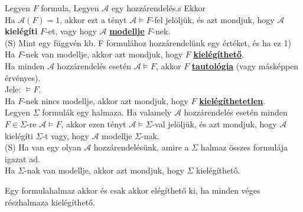 \documentclass{beamer}
\newcommand{\mbigskip}{\vspace{1em}}
\begin{document}
\begin{frame}

\begin{tcolorbox}[squeezed title={Formula modellje, Kielégíthető, Tautológia, Kielégíthetetlen}]
Legyen $F$ formula, Legyen $\mathcal{A}$ egy hozzárendelés.s Ekkor\\
\mbigskip
Ha $\mathcal{A}(F) = 1$, akkor ezt a tényt $\mathcal{A} \models F$-fel jelöljük, és azt mondjuk, hogy $\mathcal{A}$ \textbf{kielégíti} $F$-et, vagy hogy $\mathcal{A}$ \underline{\textbf{modellje}} $F$-nek.\\
{\tiny (S) Mint egy függvén kb. F formulához hozzárendelünk egy értéket, és ha ez 1)}\\
\mbigskip
Ha $F$-nek van modellje, akkor azt mondjuk, hogy $F$ \underline{\textbf{kielégíthető}}.\\
\mbigskip
Ha minden $\mathcal{A}$ hozzárendelés esetén $\mathcal{A} \models F$, akkor $F$ \underline{\textbf{tautológia}} (vagy másképpen érvényes).\\
Jele: $\models F$.\\
\mbigskip
Ha $F$-nek nincs modellje, akkor azt mondjuk, hogy $F$ \underline{\textbf{kielégíthetetlen}}.\\
\mbigskip
Legyen $\Sigma$ formulák egy halmaza. Ha valamely $\mathcal{A}$ hozzárendelés esetén minden $F \in \Sigma$-re $\mathcal{A} \models F$, akkor ezen tényt $\mathcal{A} \models \Sigma$-val jelöljük, és azt mondjuk, hogy $\mathcal{A}$ kielégíti $\Sigma$-t vagy, hogy $\mathcal{A}$ modellje $\Sigma$-nak.\\
{\tiny (S) Ha van egy olyan $\mathcal{A}$ hozzárendelésünk, amire a $\Sigma$ halmaz összes formulája igazat ad.}\\
\mbigskip
Ha $\Sigma$-nak van modellje, akkor azt mondjuk, hogy $\Sigma$ kielégíthető.
\end{tcolorbox}
\end{frame}

\begin{frame}
\begin{tcolorbox}[title={Tétel: Az ítéletkalkulus kompaktsági tétele}]
Egy formulahalmaz akkor és csak akkor elégíthető ki, ha minden véges részhalmaza kielégíthető.
\end{tcolorbox}
\end{frame}
\end{document}
